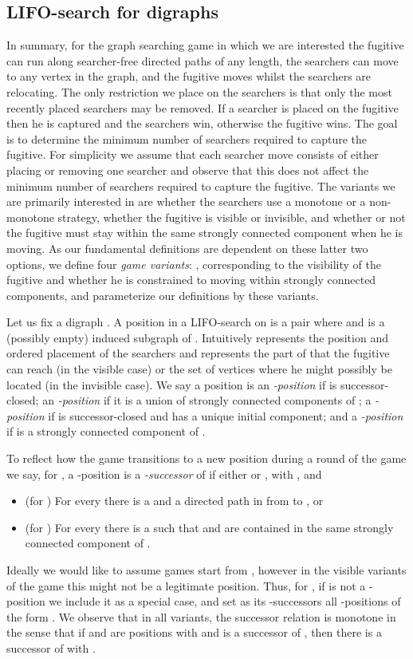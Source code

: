 \documentclass{llncs}
\begin{document}
\subsection{LIFO-search for digraphs}
In summary, for the graph searching game in which we are interested the fugitive can run along searcher-free directed paths of any length, the searchers can move to any vertex in the graph, and the fugitive moves whilst the searchers are relocating.
The only restriction we place on the searchers is that only the most recently placed searchers may be removed.   If a searcher is placed on the fugitive then he is captured and the searchers win,  otherwise the fugitive wins.
The goal is to determine the minimum number of searchers required to capture the fugitive.  For simplicity we assume that each searcher move consists of either placing or removing one searcher and observe that this does not affect the minimum number of searchers required to capture the fugitive.
The variants we are primarily interested in are whether the searchers use a monotone or a non-monotone strategy, whether the fugitive is visible or invisible, and whether or not the fugitive must stay within the same strongly connected component when he is moving.   As our fundamental definitions are dependent on these latter two options, we define four \emph{game variants}: , corresponding to the visibility of the fugitive and whether he is constrained to moving within strongly connected components, and parameterize our definitions by these variants.


Let us fix a digraph .  A position in a LIFO-search on  is a pair  where  and  is a (possibly empty) induced subgraph of .  Intuitively  represents the position and ordered placement of the searchers and  represents the part of  that the fugitive can reach (in the visible case) or the set of vertices where he might possibly be located (in the invisible case).
We say a position  is an \emph{-position} if  is successor-closed;  an \emph{-position} if it is a union of strongly connected components of ; a \emph{-position} if  is successor-closed and has a unique initial component; and a \emph{-position} if  is a strongly connected component of .
   
To reflect how the game transitions to a new position during a round of the game we say, for , a -position  is a \emph{-successor} of  if
either  or , with , and 
\begin{itemize}
\item (for ) For every  there is a  and a directed path in  from  to , or
\item (for ) For every  there is a  such that  and  are contained in the same strongly connected component of .
\end{itemize}
Ideally we would like to assume games start from , however in the visible variants of the game this might not be a legitimate position.  Thus, for , if  is not a -position we include it as a special case, and set as its -successors all -positions of the form .  
We observe that in all variants, the successor relation is monotone in the sense that if  and  are positions with  and  is a successor of , then there is a successor  of  with .
\end{document}
